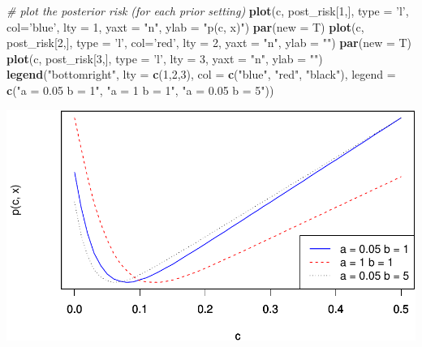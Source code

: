 \documentclass[
]{article}
\newenvironment{Shaded}{\begin{snugshade}}{\end{snugshade}}
\newcommand{\CommentTok}[1]{\textcolor[rgb]{0.56,0.35,0.01}{\textit{#1}}}
\newcommand{\DataTypeTok}[1]{\textcolor[rgb]{0.13,0.29,0.53}{#1}}
\newcommand{\DecValTok}[1]{\textcolor[rgb]{0.00,0.00,0.81}{#1}}
\newcommand{\KeywordTok}[1]{\textcolor[rgb]{0.13,0.29,0.53}{\textbf{#1}}}
\newcommand{\NormalTok}[1]{#1}
\newcommand{\StringTok}[1]{\textcolor[rgb]{0.31,0.60,0.02}{#1}}
\begin{document}
\begin{Shaded}
\begin{Highlighting}[]
\CommentTok{# plot the posterior risk (for each prior setting)}
\KeywordTok{plot}\NormalTok{(c, post_risk[}\DecValTok{1}\NormalTok{,], }\DataTypeTok{type =} \StringTok{'l'}\NormalTok{, }\DataTypeTok{col=}\StringTok{'blue'}\NormalTok{, }\DataTypeTok{lty =} \DecValTok{1}\NormalTok{, }\DataTypeTok{yaxt =} \StringTok{"n"}\NormalTok{, }\DataTypeTok{ylab =} \StringTok{"p(c, x)"}\NormalTok{)}
\KeywordTok{par}\NormalTok{(}\DataTypeTok{new =}\NormalTok{ T)}
\KeywordTok{plot}\NormalTok{(c, post_risk[}\DecValTok{2}\NormalTok{,], }\DataTypeTok{type =} \StringTok{'l'}\NormalTok{, }\DataTypeTok{col=}\StringTok{'red'}\NormalTok{, }\DataTypeTok{lty =} \DecValTok{2}\NormalTok{, }\DataTypeTok{yaxt =} \StringTok{"n"}\NormalTok{, }\DataTypeTok{ylab =} \StringTok{""}\NormalTok{)}
\KeywordTok{par}\NormalTok{(}\DataTypeTok{new =}\NormalTok{ T)}
\KeywordTok{plot}\NormalTok{(c, post_risk[}\DecValTok{3}\NormalTok{,], }\DataTypeTok{type =} \StringTok{'l'}\NormalTok{, }\DataTypeTok{lty =} \DecValTok{3}\NormalTok{, }\DataTypeTok{yaxt =} \StringTok{"n"}\NormalTok{, }\DataTypeTok{ylab =} \StringTok{""}\NormalTok{)}
\KeywordTok{legend}\NormalTok{(}\StringTok{"bottomright"}\NormalTok{, }\DataTypeTok{lty =} \KeywordTok{c}\NormalTok{(}\DecValTok{1}\NormalTok{,}\DecValTok{2}\NormalTok{,}\DecValTok{3}\NormalTok{), }\DataTypeTok{col =} \KeywordTok{c}\NormalTok{(}\StringTok{"blue"}\NormalTok{, }\StringTok{"red"}\NormalTok{, }\StringTok{"black"}\NormalTok{), }
       \DataTypeTok{legend =} \KeywordTok{c}\NormalTok{(}\StringTok{"a = 0.05 b = 1"}\NormalTok{, }\StringTok{"a = 1 b = 1"}\NormalTok{, }\StringTok{"a = 0.05 b = 5"}\NormalTok{))}
\end{Highlighting}
\end{Shaded}

\includegraphics{lab-03_files/figure-latex/unnamed-chunk-5-1.pdf}
\end{document}
